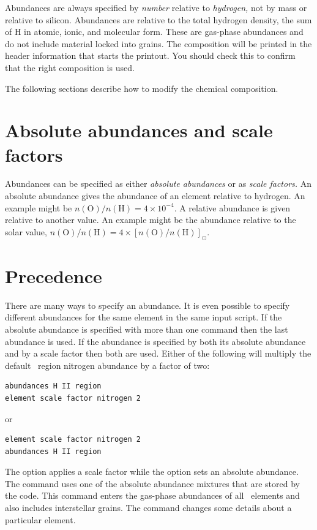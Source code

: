 Abundances are always specified by \emph{number} relative to
\emph{hydrogen,} not by mass or relative to silicon.
Abundances are relative to the total hydrogen
density, the sum of H in atomic, ionic, and molecular form.
These are gas-phase abundances
and do not include material locked into grains.
The
composition will be printed in the header information that starts the
printout.
You should check this to confirm that the right composition is
used.

The following sections describe how to modify the chemical composition.

\section{Absolute abundances and scale factors }

Abundances can be specified as either \emph{absolute abundances} or as
\emph{scale factors.}
An absolute abundance gives the abundance of an element relative
to hydrogen.
An example might be $n(\mathrm{O} ) /n( \mathrm{H} ) = 4 \times 10^{-4}$.
A relative abundance
is given relative to another value.
An example might be the abundance
relative to the solar value, $n(\mathrm{O}) / n(\mathrm{H}) = 4 \times
[n(\mathrm{O})/n(\mathrm{H})]_\odot$.

\section{Precedence}

There are many ways to specify an abundance.
It is even possible to specify different abundances for the
same element in the same input script.
If the absolute abundance is specified with more than one command then
the last abundance is used.
If the abundance is specified by both its
absolute abundance and by a scale factor then both are used.
Either of
the following will multiply the default \hii\ region nitrogen abundance by
a factor of two:
\begin{verbatim}
abundances H II region
element scale factor nitrogen 2
\end{verbatim}
or
\begin{verbatim}
element scale factor nitrogen 2
abundances H II region
\end{verbatim}
The  option applies a scale factor
while the
 option sets an absolute abundance.
The 
command uses one of the absolute abundance mixtures that are stored
by the code.
This command enters the gas-phase
abundances of all \LIMELM\ elements and also includes interstellar grains.
The  command changes some details about a particular element.

